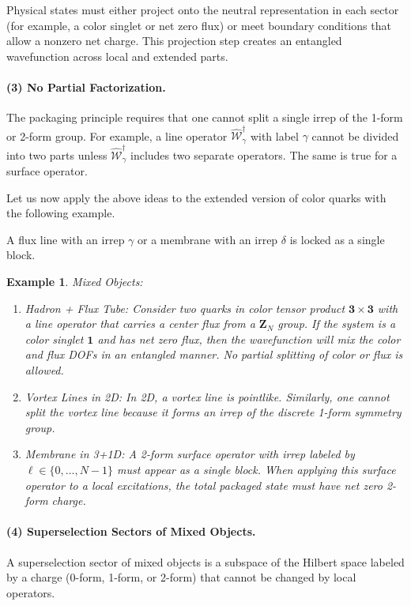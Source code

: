 \documentclass[12pt,a4paper]{article}
\newtheorem{example}{Example}
\begin{document}
Physical states must either project onto the neutral representation in each sector (for example, a color singlet or net zero flux) or meet boundary conditions that allow a nonzero net charge.
This projection step creates an entangled wavefunction across local and extended parts.


\paragraph{(3) No Partial Factorization.}
The packaging principle requires that one cannot split a single irrep of the 1-form or 2-form group.
For example, a line operator $\hat{\mathcal{W}}^\dagger_{\gamma}$ with label $\gamma$ cannot be divided into two parts unless $\hat{\mathcal{W}}^\dagger_{\gamma}$ includes two separate operators.
The same is true for a surface operator.


Let us now apply the above ideas to the extended version of color quarks with the following example. 

A flux line with an irrep $\gamma$ or a membrane with an irrep $\delta$ is locked as a single block.


\begin{example}
	Mixed Objects:
	
	\begin{enumerate}
		\item Hadron + Flux Tube:  
		Consider two quarks in color tensor product $\mathbf{3}\times \mathbf{3}$ with a line operator that carries a center flux from a $\mathbf{Z}_N$ group.
		If the system is a color singlet $\mathbf{1}$ and has net zero flux, then the wavefunction will mix the color and flux DOFs in an entangled manner.
		No partial splitting of color or flux is allowed.  
		
		\item Vortex Lines in 2D:  
		In 2D, a vortex line is pointlike. Similarly, one cannot split the vortex line because it forms an irrep of the discrete 1-form symmetry group.  
		
		\item Membrane in 3+1D:  
		A 2-form surface operator with irrep labeled by $\ell \in \{0,\dots,N-1\}$ must appear as a single block.
		When applying this surface operator to a local excitations, the total packaged state must have net zero 2-form charge.
	\end{enumerate}
\end{example}


\paragraph{(4) Superselection Sectors of Mixed Objects.}
A superselection sector of mixed objects is a subspace of the Hilbert space labeled by a charge (0-form, 1-form, or 2-form) that cannot be changed by local operators.
\end{document}
